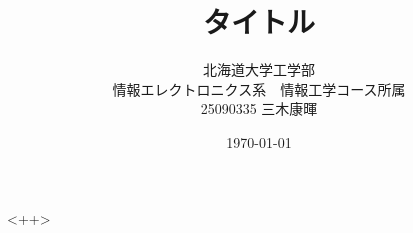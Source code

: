 \documentclass[12pt]{jarticle}
\begin{document}
\title{タイトル}
\author{北海道大学工学部\\
情報エレクトロニクス系　情報工学コース所属\\
25090335 三木康暉}
\date{\today}
\maketitle

\clearpage
<++>
\end{document}
